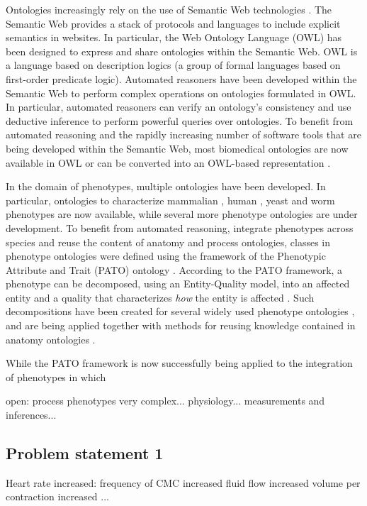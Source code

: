 \documentclass{bioinfo}
\renewcommand{\cite}{\citep}
\begin{document}
Ontologies increasingly rely on the use of Semantic Web technologies
\cite{Berners-Lee2001}. The Semantic Web provides a stack of protocols
and languages to include explicit semantics in websites. In
particular, the Web Ontology Language (OWL) \cite{Grau2008} has been
designed to express and share ontologies within the Semantic Web. OWL
is a language based on description logics (a group of formal languages
based on first-order predicate logic). Automated reasoners have been
developed within the Semantic Web to perform complex operations on
ontologies formulated in OWL. In particular, automated reasoners can
verify an ontology's consistency and use deductive inference to
perform powerful queries over ontologies. To benefit from automated
reasoning and the rapidly increasing number of software tools that are
being developed within the Semantic Web, most biomedical ontologies
are now available in OWL or can be converted into an OWL-based
representation \cite{Horrocks2007, Hoehndorf2010patterns}.

In the domain of phenotypes, multiple ontologies have been
developed. In particular, ontologies to characterize mammalian
\cite{Smith2004}, human \cite{Robinson2008}, yeast \cite{ypo} and worm
\cite{wpo} phenotypes are now available, while several more phenotype
ontologies are under development. To benefit from automated reasoning,
integrate phenotypes across species and reuse the content of anatomy
and process ontologies, classes in phenotype ontologies were defined
using the framework of the Phenotypic Attribute and Trait (PATO)
ontology \cite{Gkoutos2005}. According to the PATO framework, a
phenotype can be decomposed, using an Entity-Quality model, into an
affected entity and a quality that characterizes {\em how} the entity
is affected \cite{Gkoutos2005}. Such decompositions have been created
for several widely used phenotype ontologies \cite{Mungall2010,
  Gkoutos2009b, obml2011h1}, and are being applied together with
methods for reusing knowledge contained in anatomy ontologies
\cite{Mungall2010, Hoehndorf2010phene}.

While the PATO framework is now successfully being applied to the
integration of phenotypes in which 

open: process phenotypes very complex...  
physiology...
measurements and inferences...

\subsection{Problem statement 1}
Heart rate increased: frequency of CMC increased fluid flow increased
volume per contraction increased ...
\end{document}
